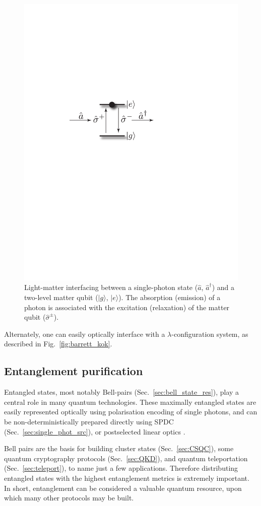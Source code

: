 \documentclass[aps,rmp,twocolumn,amsmath,amssymb,nofootinbib,superscriptaddress,longbibliography,floatfix]{revtex4-1}
\newcommand{\ket}[1]{|#1\rangle}
\begin{document}
\begin{figure}[!htb]
\includegraphics[width=0.6\columnwidth]{opt_inter}
\caption{Light-matter interfacing between a single-photon state ($\hat{a}$, $\hat{a}^\dag$) and a two-level matter qubit ($\ket{g}$, $\ket{e}$). The absorption (emission) of a photon is associated with the excitation (relaxation) of the matter qubit ($\hat\sigma^\pm$).} \label{fig:opt_int}
\end{figure}

Alternately, one can easily optically interface with a $\lambda$-configuration system, as described in Fig.~\ref{fig:barrett_kok}. 

%
%

\subsection{Entanglement purification} \label{sec:ent_purif}

Entangled states, most notably Bell-pairs (Sec.~\ref{sec:bell_state_res}), play a central role in many quantum technologies. These maximally entangled states are easily represented optically using polarisation encoding of single photons, and can be non-deterministically prepared directly using SPDC (Sec.~\ref{sec:single_phot_src}), or postselected linear optics \cite{???}.

Bell pairs are the basis for building cluster states (Sec.~\ref{sec:CSQC}), some quantum cryptography protocols (Sec.~\ref{sec:QKD}), and quantum teleportation (Sec.~\ref{sec:teleport}), to name just a few applications. Therefore distributing entangled states with the highest entanglement metrics is extremely important. In short, entanglement can be considered a valuable quantum resource, upon which many other protocols may be built.
\end{document}
